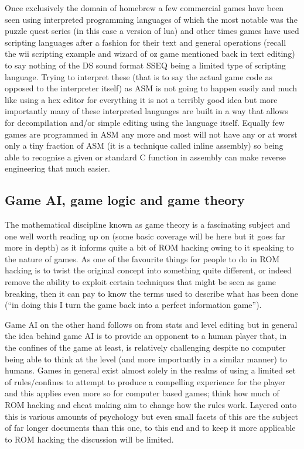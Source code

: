 \documentclass[
]{book}
\begin{document}
Once exclusively the domain of homebrew a few commercial games have been seen using interpreted programming languages of which the most notable was the puzzle quest series (in this case a version of lua) and other times games have used scripting languages after a fashion for their text and general operations (recall the wii scripting example and wizard of oz game mentioned back in text editing) to say nothing of the DS sound format SSEQ being a limited type of scripting language. Trying to interpret these (that is to say the actual game code as opposed to the interpreter itself) as ASM is not going to happen easily and much like using a hex editor for everything it is not a terribly good idea but more importantly many of these interpreted languages are built in a way that allows for decompilation and/or simple editing using the language itself. Equally few games are programmed in ASM any more and most will not have any or at worst only a tiny fraction of ASM (it is a technique called inline assembly) so being able to recognise a given or standard C function in assembly can make reverse engineering that much easier.

\hypertarget{game-ai-game-logic-and-game-theory}{%
\subsection{Game AI, game logic and game theory}\label{game-ai-game-logic-and-game-theory}}

The mathematical discipline known as game theory is a fascinating subject and one well worth reading up on (some basic coverage will be here but it goes far more in depth) as it informs quite a bit of ROM hacking owing to it speaking to the nature of games. As one of the favourite things for people to do in ROM hacking is to twist the original concept into something quite different, or indeed remove the ability to exploit certain techniques that might be seen as game breaking, then it can pay to know the terms used to describe what has been done (``in doing this I turn the game back into a perfect information game'').

Game AI on the other hand follows on from stats and level editing but in general the idea behind game AI is to provide an opponent to a human player that, in the confines of the game at least, is relatively challenging despite no computer being able to think at the level (and more importantly in a similar manner) to humans. Games in general exist almost solely in the realms of using a limited set of rules/confines to attempt to produce a compelling experience for the player and this applies even more so for computer based games; think how much of ROM hacking and cheat making aim to change how the rules work. Layered onto this is various amounts of psychology but even small facets of this are the subject of far longer documents than this one, to this end and to keep it more applicable to ROM hacking the discussion will be limited.
\end{document}
